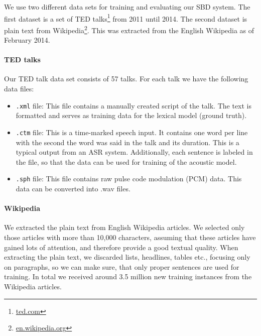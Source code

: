 
We use two different data sets for training and evaluating our SBD system.
The first dataset is a set of TED talks\footnote{\url{ted.com}} from 2011 until 2014.
The second dataset is plain text from Wikipedia\footnote{\url{en.wikipedia.org}}.
This was extracted from the English Wikipedia as of February 2014.

\paragraph{TED talks}
Our TED talk data set consists of 57 talks. For each talk we have the following data files:
\begin{itemize}
	\item \texttt{.xml} file: This file contains a manually created script of the talk.
	The text is formatted and serves as training data for the lexical model (ground truth).
	\item \texttt{.ctm} file: This is a time-marked speech input.
	It contains one word per line with the second the word was said in the talk and its duration.
    This is a typical output from an ASR system.
	Additionally, each sentence is labeled in the file, so that the data can be used for training of the acoustic model.
	\item \texttt{.sph} file: This file contains raw pulse code modulation (PCM) data.
	This data can be converted into .wav files.
\end{itemize}

\paragraph{Wikipedia}
We extracted the plain text from English Wikipedia articles.
We selected only those articles with more than 10,000 characters, assuming that these articles have gained lots of attention, and therefore provide a good textual quality.
When extracting the plain text, we discarded lists, headlines, tables etc., focusing only on paragraphs, so we can make sure, that only proper sentences are used for training.
In total we received around 3.5 million new training instances from the Wikipedia articles.
